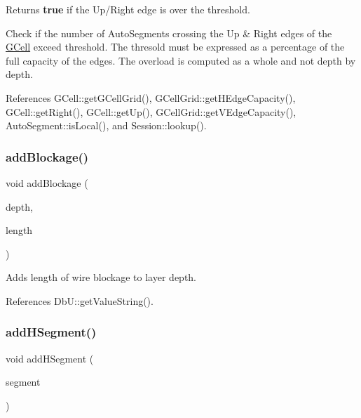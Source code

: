 \begin{DoxyReturn}{Returns}
{\bfseries true} if the Up/\+Right edge is over the {\ttfamily threshold}.
\end{DoxyReturn}
Check if the number of Auto\+Segments crossing the Up \& Right edges of the \hyperlink{classKatabatic_1_1GCell}{G\+Cell} exceed {\ttfamily threshold}. The {\ttfamily thresold} must be expressed as a percentage of the full capacity of the edges. The overload is computed as a whole and not depth by depth. 

References G\+Cell\+::get\+G\+Cell\+Grid(), G\+Cell\+Grid\+::get\+H\+Edge\+Capacity(), G\+Cell\+::get\+Right(), G\+Cell\+::get\+Up(), G\+Cell\+Grid\+::get\+V\+Edge\+Capacity(), Auto\+Segment\+::is\+Local(), and Session\+::lookup().

\mbox{\label{classKatabatic_1_1GCell_a1270eab34ac57f21c0286a5455044a0d}} 
\subsubsection{\texorpdfstring{add\+Blockage()}{addBlockage()}}
{\footnotesize\ttfamily void add\+Blockage (\begin{DoxyParamCaption}\item[{unsigned int}]{depth,  }\item[{\textbf{ Db\+U\+::\+Unit}}]{length }\end{DoxyParamCaption})}

Adds {\ttfamily length} of wire blockage to layer {\ttfamily depth}. 

References Db\+U\+::get\+Value\+String().

\mbox{\label{classKatabatic_1_1GCell_a4aad7d6f7357fd7963aab91bc2019a1b}} 
\subsubsection{\texorpdfstring{add\+H\+Segment()}{addHSegment()}}
{\footnotesize\ttfamily void add\+H\+Segment (\begin{DoxyParamCaption}\item[{\hyperlink{classKatabatic_1_1AutoSegment}{Auto\+Segment} $\ast$}]{segment }\end{DoxyParamCaption})\hspace{0.3cm}{\ttfamily [inline]}}

